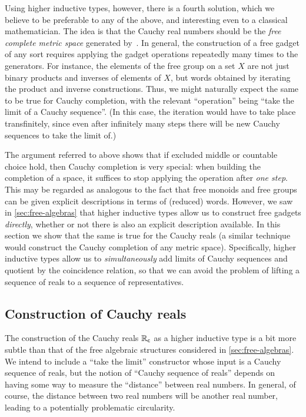 Using higher inductive types, however, there is a fourth solution, which we believe to be preferable to any of the above, and interesting even to a classical mathematician.
The idea is that the Cauchy real numbers should be the \emph{free complete metric space} generated by~\Q.
In general, the construction of a free gadget of any sort requires applying the gadget operations repeatedly many times to the generators.
For instance, the elements of the free group on a set $X$ are not just binary products and inverses of elements of $X$, but words obtained by iterating the product and inverse constructions.
Thus, we might naturally expect the same to be true for Cauchy completion, with the relevant ``operation'' being ``take the limit of a Cauchy sequence''.
(In this case, the iteration would have to take place transfinitely, since even after infinitely many steps there will be new Cauchy sequences to take the limit of.)

The argument referred to above shows that if excluded middle or countable choice hold, then Cauchy completion is very special: when building the completion of a space, it suffices to stop applying the operation after \emph{one step}.
This may be regarded as analogous to the fact that free monoids and free groups can be given explicit descriptions in terms of (reduced) words.
However, we saw in \autoref{sec:free-algebras} that higher inductive types allow us to construct free gadgets \emph{directly}, whether or not there is also an explicit description available.
In this section we show that the same is true for the Cauchy reals (a similar technique would construct the Cauchy completion of any metric space).
Specifically, higher inductive types allow us to \emph{simultaneously} add limits of Cauchy sequences and quotient by the coincidence relation, so that we can avoid the problem of lifting a sequence of reals to a sequence of representatives.


\subsection{Construction of Cauchy reals}
\label{sec:constr-cauchy-reals}

The construction of the Cauchy reals $\mathbb{R}_\mathsf{c}$ as a higher inductive type is a bit more subtle than that of the free algebraic structures considered in \autoref{sec:free-algebras}.
We intend to include a ``take the limit'' constructor whose input is a Cauchy sequence of reals, but the notion of ``Cauchy sequence of reals'' depends on having some way to measure the ``distance'' between real numbers.
In general, of course, the distance between two real numbers will be another real number, leading to a potentially problematic circularity.

